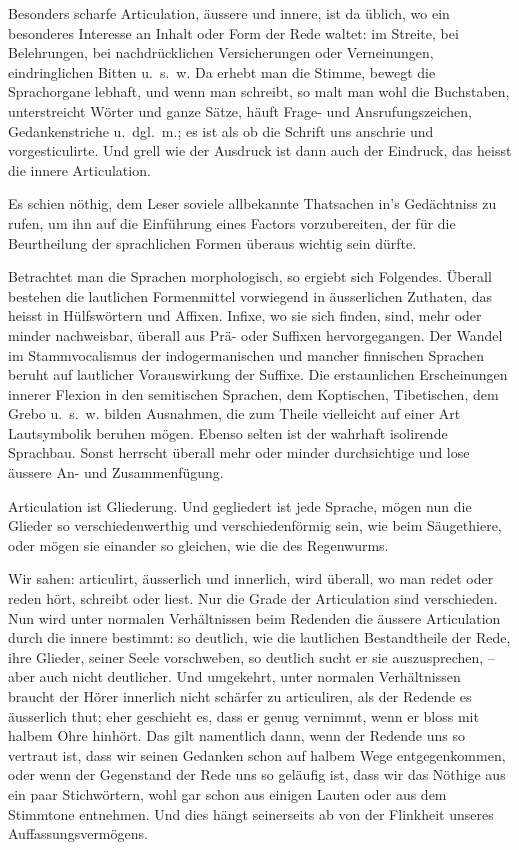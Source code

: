 \largerpage[-1]Besonders scharfe Articulation, äussere und innere, ist da üblich, wo ein besonderes Interesse an Inhalt oder Form der Rede waltet: im Streite, bei Belehrungen, bei nachdrücklichen Versicherungen oder Verneinungen, eindringlichen Bitten u.~s.~w. Da erhebt man die Stimme, \label{fp.413} bewegt die Sprachorgane lebhaft, und wenn man schreibt, so malt man wohl die Buchstaben, unterstreicht Wörter und ganze Sätze, häuft Frage- und Ansrufungszeichen, Gedankenstriche u.~dgl.~m.; es ist als ob die Schrift uns anschrie und vorgesticulirte. Und grell wie der Ausdruck ist dann auch der Eindruck, das heisst die innere Articulation.

Es schien nöthig, dem Leser soviele allbekannte Thatsachen in’s Gedächtniss zu rufen, um ihn auf die Einführung eines Factors vorzubereiten, der für die Beurtheilung der sprachlichen Formen überaus wichtig sein dürfte.

Betrachtet man die Sprachen morphologisch, so ergiebt sich Folgendes. Überall bestehen die lautlichen Formenmittel vorwiegend in äusserlichen Zuthaten, das heisst in Hülfswörtern und Affixen. Infixe, wo sie sich finden, sind, mehr oder minder nachweisbar, überall aus Prä- oder Suffixen hervorgegangen. Der Wandel im Stammvocalismus der indogermanischen und mancher finnischen Sprachen beruht auf lautlicher Vorauswirkung der Suffixe. Die erstaunlichen Erscheinungen innerer Flexion in den semitischen Sprachen, dem Koptischen, Tibetischen, dem Grebo u.~s.~w. bilden Ausnahmen, die zum Theile vielleicht auf einer Art Lautsymbolik beruhen mögen. Ebenso selten ist der wahrhaft isolirende Sprachbau. Sonst herrscht überall mehr oder minder durchsichtige und lose äussere An- und Zusammenfügung.

Articulation ist Gliederung. Und gegliedert ist jede Sprache, mögen nun die Glieder so verschiedenwerthig und verschiedenförmig sein, wie beim Säugethiere, oder mögen sie einander so gleichen, wie die des Regenwurms.

Wir sahen: articulirt, äusserlich und innerlich, wird überall, wo man redet oder reden hört, schreibt oder liest. Nur die Grade der Articulation sind verschieden. Nun wird unter normalen Verhältnissen beim Redenden die äussere Articulation durch die innere bestimmt: so deutlich, wie die lautlichen Bestand\label{sp.435}theile der Rede, ihre Glieder, seiner Seele vorschweben, so deutlich sucht er sie auszusprechen, – aber auch nicht deutlicher. Und umgekehrt, unter normalen Verhältnissen braucht der Hörer innerlich nicht schärfer zu articuliren, als der Redende es äusserlich thut; eher geschieht es, dass er genug vernimmt, wenn er bloss mit halbem Ohre hinhört. Das gilt namentlich dann, wenn der Redende uns so vertraut ist, dass wir seinen Gedanken schon auf halbem Wege entgegenkommen, oder wenn der Gegenstand der Rede uns so geläufig ist, \label{fp.414} dass wir das Nöthige aus ein paar Stichwörtern, wohl gar schon aus einigen Lauten oder aus dem Stimmtone entnehmen. Und dies hängt seinerseits ab von der Flinkheit unseres Auffassungsvermögens.

